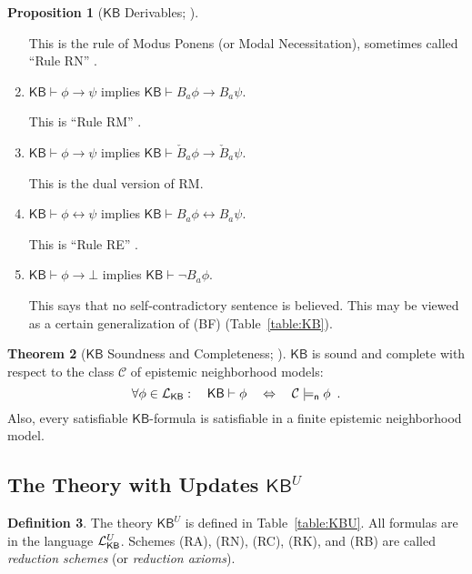 \documentclass[12pt]{article}
\theoremstyle{definition}
\newtheorem{theorem}{Theorem}[section]
\newtheorem{proposition}[theorem]{Proposition}
\newtheorem{definition}[theorem]{Definition}
\newcommand{\Lang}{{\cal L}}   %
\newcommand{\KB}{{\mathsf{KB}}}                        %
\newcommand{\modelsn}{\models_{\mathsf{n}}}                  %
\begin{document}
\begin{proposition}[$\KB$ Derivables; \cite{EijRen14:BEPL}]
\begin{enumerate}
    This is the rule of Modus Ponens (or Modal Necessitation),
    sometimes called ``Rule RN'' \cite[Ch.~8]{Chellas:ml}.

  \item $\KB\vdash\phi\to\psi$ implies $\KB\vdash B_a\phi\to B_a\psi$.
    \label{derivables:Bimp}

    This is ``Rule RM'' \cite[Ch.~8]{Chellas:ml}.

  \item $\KB\vdash\phi\to\psi$ implies $\KB\vdash\check
    B_a\phi\to\check B_a\psi$.
    \label{derivables:check-Bimp}
    
    This is the dual version of RM.
    
  \item $\KB\vdash\phi\leftrightarrow\psi$ implies
    $\KB\vdash B_a\phi\leftrightarrow B_a\psi$.
    \label{derivables:RE}

    This is ``Rule RE'' \cite[Ch.~8]{Chellas:ml}.

  \item $\KB\vdash\phi\to\bot$ implies $\KB\vdash\lnot
    B_a\phi$. \label{derivables:GBF}

    This says that no self-contradictory sentence is believed.  This
    may be viewed as a certain generalization of (BF)
    (Table~\ref{table:KB}).
  \end{enumerate}
\end{proposition}

\begin{theorem}[$\KB$ Soundness and Completeness; \cite{EijRen14:BEPL}]
  \label{theorem:KB-neighborhood-soundness}
  $\KB$ is sound and complete with respect to the class $\mathcal{C}$ of
  epistemic neighborhood models:
  \[
  \forall\phi\in\Lang_\KB:\quad\KB\vdash\phi
  \quad\Leftrightarrow\quad
  \mathcal{C}\modelsn\phi
  \enspace.
  \]
  Also, every satisfiable $\KB$-formula is satisfiable in a finite
  epistemic neighborhood model.
\end{theorem}

\subsection{The Theory with Updates
  \texorpdfstring{$\KB^U$}{KBU}}

\begin{definition}
  The theory $\KB^U$ is defined in Table~\ref{table:KBU}.  All
  formulas are in the language $\Lang_\KB^U$. Schemes (RA), (RN), (RC),
  (RK), and (RB) are called \emph{reduction schemes} (or
  \emph{reduction axioms}).
\end{definition}
\end{document}
